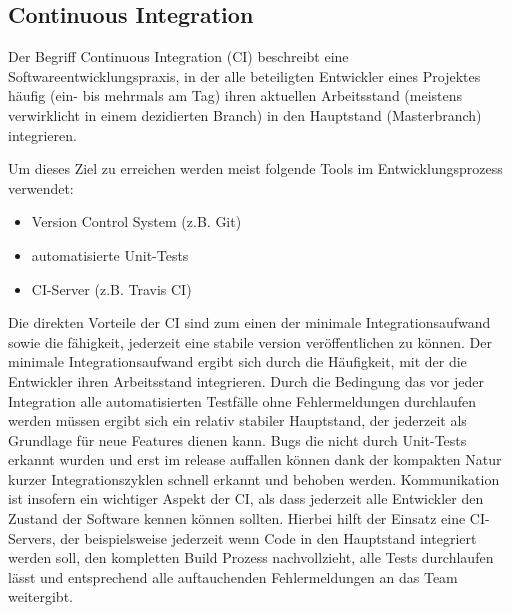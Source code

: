 \subsection{Continuous Integration}
Der Begriff Continuous Integration (CI) beschreibt eine Softwareentwicklungspraxis,
in der alle beteiligten Entwickler eines Projektes häufig (ein- bis mehrmals am Tag) ihren aktuellen
Arbeitsstand (meistens verwirklicht in einem dezidierten Branch) in den Hauptstand
(Masterbranch) integrieren.

Um dieses Ziel zu erreichen werden meist folgende Tools im Entwicklungsprozess 
verwendet:

\begin{itemize}
	\item Version Control System (z.B. Git)
	\item automatisierte Unit-Tests
	\item CI-Server (z.B. Travis CI)
\end{itemize}

Die direkten Vorteile der CI sind zum einen der minimale Integrationsaufwand sowie die fähigkeit, 
jederzeit eine stabile version veröffentlichen zu können.
Der minimale Integrationsaufwand ergibt sich durch die Häufigkeit,
mit der die Entwickler ihren Arbeitsstand integrieren. Durch die
Bedingung das vor jeder Integration alle automatisierten Testfälle ohne Fehlermeldungen durchlaufen
werden müssen ergibt sich ein relativ stabiler Hauptstand, der jederzeit als Grundlage für neue Features dienen kann.
Bugs die nicht durch Unit-Tests erkannt wurden und erst im release auffallen können dank der kompakten Natur kurzer
Integrationszyklen schnell erkannt und behoben werden.
Kommunikation ist insofern ein wichtiger Aspekt der CI, als dass jederzeit alle Entwickler den Zustand der Software
kennen können sollten. Hierbei hilft der Einsatz eine CI-Servers, der beispielsweise jederzeit wenn Code in den Hauptstand
integriert werden soll, den kompletten Build Prozess nachvollzieht, alle Tests durchlaufen lässt und entsprechend alle
auftauchenden Fehlermeldungen an das Team weitergibt.